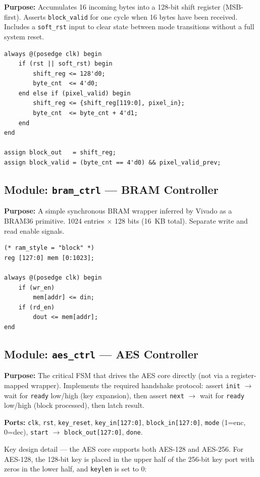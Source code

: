 \documentclass[12pt,a4paper]{article}
\begin{document}
\textbf{Purpose:} Accumulates 16 incoming bytes into a 128-bit shift register (MSB-first). Asserts \texttt{block\_valid} for one cycle when 16 bytes have been received. Includes a \texttt{soft\_rst} input to clear state between mode transitions without a full system reset.

\begin{lstlisting}
always @(posedge clk) begin
    if (rst || soft_rst) begin
        shift_reg <= 128'd0;
        byte_cnt  <= 4'd0;
    end else if (pixel_valid) begin
        shift_reg <= {shift_reg[119:0], pixel_in};
        byte_cnt  <= byte_cnt + 4'd1;
    end
end

assign block_out   = shift_reg;
assign block_valid = (byte_cnt == 4'd0) && pixel_valid_prev;
\end{lstlisting}

\subsection{Module: \texttt{bram\_ctrl} — BRAM Controller}

\textbf{Purpose:} A simple synchronous BRAM wrapper inferred by Vivado as a BRAM36 primitive. 1024 entries $\times$ 128 bits (16~KB total). Separate write and read enable signals.

\begin{lstlisting}
(* ram_style = "block" *)
reg [127:0] mem [0:1023];

always @(posedge clk) begin
    if (wr_en)
        mem[addr] <= din;
    if (rd_en)
        dout <= mem[addr];
end
\end{lstlisting}

\subsection{Module: \texttt{aes\_ctrl} — AES Controller}

\textbf{Purpose:} The critical FSM that drives the AES core directly (not via a register-mapped wrapper). Implements the required handshake protocol: assert \texttt{init} $\to$ wait for \texttt{ready} low/high (key expansion), then assert \texttt{next} $\to$ wait for \texttt{ready} low/high (block processed), then latch result.

\textbf{Ports:} \texttt{clk}, \texttt{rst}, \texttt{key\_reset}, \texttt{key\_in[127:0]}, \texttt{block\_in[127:0]}, \texttt{mode} (1=enc, 0=dec), \texttt{start} $\to$ \texttt{block\_out[127:0]}, \texttt{done}.

Key design detail — the AES core supports both AES-128 and AES-256. For AES-128, the 128-bit key is placed in the upper half of the 256-bit key port with zeros in the lower half, and \texttt{keylen} is set to 0:
\end{document}
